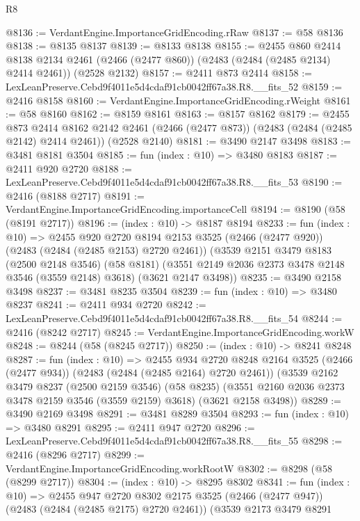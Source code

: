 \begin{lexlean}{R8}
\begin{coremodule}
@8136 := VerdantEngine.ImportanceGridEncoding.rRaw
@8137 := @58 @8136
@8138 := @8135 @8137
@8139 := @8133 @8138
@8155 := @2455
    @860
    @2414
    @8138
    @2134
    @2461
    (@2466 (@2477 @860))
    (@2483 (@2484 (@2485 @2134) @2414 @2461))
    (@2528 @2132)
@8157 := @2411 @873 @2414
@8158 := LexLeanPreserve.Cebd9f4011e5d4cdaf91cb0042ff67a38.R8.__fits_52
@8159 := @2416 @8158
@8160 := VerdantEngine.ImportanceGridEncoding.rWeight
@8161 := @58 @8160
@8162 := @8159 @8161
@8163 := @8157 @8162
@8179 := @2455
    @873
    @2414
    @8162
    @2142
    @2461
    (@2466 (@2477 @873))
    (@2483 (@2484 (@2485 @2142) @2414 @2461))
    (@2528 @2140)
@8181 := @3490 @2147 @3498
@8183 := @3481 @8181 @3504
@8185 := fun (index : @10) => @3480 @8183
@8187 := @2411 @920 @2720
@8188 := LexLeanPreserve.Cebd9f4011e5d4cdaf91cb0042ff67a38.R8.__fits_53
@8190 := @2416 (@8188 @2717)
@8191 := VerdantEngine.ImportanceGridEncoding.importanceCell
@8194 := @8190 (@58 (@8191 @2717))
@8196 := (index : @10) -> @8187 @8194
@8233 := fun (index : @10) =>
  @2455
    @920
    @2720
    @8194
    @2153
    @3525
    (@2466 (@2477 @920))
    (@2483 (@2484 (@2485 @2153) @2720 @2461))
    (@3539
      @2151
      @3479
      @8183
      (@2500 @2148 @3546)
      (@58 @8181)
      (@3551 @2149 @2036 @2373 @3478 @2148 @3546 (@3559 @2148) @3618)
      (@3621 @2147 @3498))
@8235 := @3490 @2158 @3498
@8237 := @3481 @8235 @3504
@8239 := fun (index : @10) => @3480 @8237
@8241 := @2411 @934 @2720
@8242 := LexLeanPreserve.Cebd9f4011e5d4cdaf91cb0042ff67a38.R8.__fits_54
@8244 := @2416 (@8242 @2717)
@8245 := VerdantEngine.ImportanceGridEncoding.workW
@8248 := @8244 (@58 (@8245 @2717))
@8250 := (index : @10) -> @8241 @8248
@8287 := fun (index : @10) =>
  @2455
    @934
    @2720
    @8248
    @2164
    @3525
    (@2466 (@2477 @934))
    (@2483 (@2484 (@2485 @2164) @2720 @2461))
    (@3539
      @2162
      @3479
      @8237
      (@2500 @2159 @3546)
      (@58 @8235)
      (@3551 @2160 @2036 @2373 @3478 @2159 @3546 (@3559 @2159) @3618)
      (@3621 @2158 @3498))
@8289 := @3490 @2169 @3498
@8291 := @3481 @8289 @3504
@8293 := fun (index : @10) => @3480 @8291
@8295 := @2411 @947 @2720
@8296 := LexLeanPreserve.Cebd9f4011e5d4cdaf91cb0042ff67a38.R8.__fits_55
@8298 := @2416 (@8296 @2717)
@8299 := VerdantEngine.ImportanceGridEncoding.workRootW
@8302 := @8298 (@58 (@8299 @2717))
@8304 := (index : @10) -> @8295 @8302
@8341 := fun (index : @10) =>
  @2455
    @947
    @2720
    @8302
    @2175
    @3525
    (@2466 (@2477 @947))
    (@2483 (@2484 (@2485 @2175) @2720 @2461))
    (@3539
      @2173
      @3479
      @8291

\end{coremodule}
\end{lexlean}
